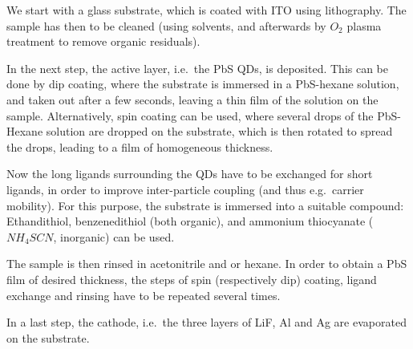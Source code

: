 We start with a glass substrate, which is coated with ITO using lithography. The sample has then to be cleaned (using solvents, and afterwards by $O_2$ plasma treatment to remove organic residuals). 

In the next step, the active layer, i.e.~the PbS QDs, is deposited. This can be done by dip coating, where the substrate is immersed in a PbS-hexane solution, and taken out after a few seconds, leaving a thin film of the solution on the sample. Alternatively, spin coating can be used, where several drops of the PbS-Hexane solution are dropped on the substrate, which is then rotated to spread the drops, leading to a film of homogeneous thickness. 

Now the long ligands surrounding the QDs have to be exchanged for short ligands, in order to improve inter-particle coupling (and thus e.g.~carrier mobility). For this purpose, the substrate is immersed into a suitable compound: Ethandithiol, benzenedithiol (both organic), and ammonium thiocyanate ($NH_4SCN$, inorganic) can be used.

The sample is then rinsed in acetonitrile and or hexane. In order to obtain a PbS film of desired thickness, the steps of spin (respectively dip) coating, ligand exchange and rinsing have to be repeated several times.

In a last step, the cathode, i.e.~the three layers of LiF, Al and Ag are evaporated on the substrate.
	